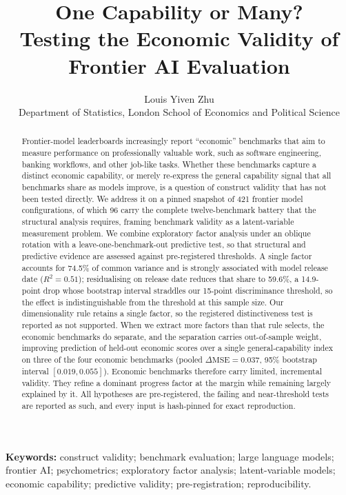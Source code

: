 \title{\vspace{-1.5em}One Capability or Many?\\ Testing the Economic Validity of Frontier AI Evaluation}
\author{Louis Yiven Zhu\\
\small Department of Statistics, London School of Economics and Political Science}
\date{}
\maketitle

\begin{abstract}
\noindent
Frontier-model leaderboards increasingly report ``economic'' benchmarks that aim to measure performance
on professionally valuable work, such as software engineering, banking workflows, and other job-like
tasks. Whether these benchmarks capture a distinct economic capability, or merely re-express the general
capability signal that all benchmarks share as models improve, is a question of construct validity that
has not been tested directly. We address it on a pinned snapshot of 421 frontier model configurations,
of which 96 carry the complete twelve-benchmark battery that the structural analysis requires, framing
benchmark validity as a latent-variable measurement problem. We combine exploratory factor analysis
under an oblique rotation with a leave-one-benchmark-out predictive test, so that structural and
predictive evidence are assessed against pre-registered thresholds. A single factor accounts for 74.5\%
of common variance and is strongly associated with model release date ($R^2=0.51$); residualising on
release date reduces that share to 59.6\%, a 14.9-point drop whose bootstrap interval straddles our
15-point discriminance threshold, so the effect is indistinguishable from the threshold at this sample
size. Our dimensionality rule retains a single factor, so the registered distinctiveness test is
reported as not supported. When we extract more factors than that rule selects,
the economic benchmarks do separate, and the separation carries out-of-sample weight, improving prediction
of held-out economic scores over a single general-capability index on three of the four economic
benchmarks (pooled $\Delta\mathrm{MSE}=0.037$, 95\% bootstrap interval $[0.019, 0.055]$). Economic
benchmarks therefore carry limited, incremental validity. They refine a dominant progress factor at the
margin while remaining largely explained by it. All hypotheses are pre-registered, the failing and
near-threshold tests are reported as such, and every input is hash-pinned for exact reproduction.
\end{abstract}

\vspace{0.5em}
\noindent\textbf{Keywords:} construct validity; benchmark evaluation; large language models; frontier AI;
psychometrics; exploratory factor analysis; latent-variable models; economic capability; predictive
validity; pre-registration; reproducibility.
\vspace{0.5em}